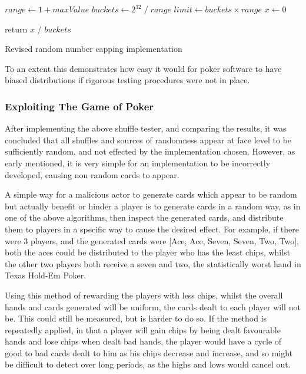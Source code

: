 \vspace{0.3cm}

\begin{algorithm}[H]
    \BlankLine{}
     $range \leftarrow 1 + maxValue$\;
     $buckets \leftarrow {2}^{32}\; / \;range$\;
     $limit \leftarrow buckets \times range$\;
     $x \leftarrow 0$\;

     

     return $x$ / $buckets$\;
\caption{Revised random number capping implementation}%
\label{code:rngGoodCapping}
\end{algorithm}

\vspace{0.3cm}

To an extent this demonstrates how easy it would for poker software to have
biased distributions if rigorous testing procedures were not in place.

\subsubsection{Exploiting The Game of Poker}

After implementing the above shuffle tester, and comparing the results,
it was concluded that all shuffles and sources of randomness appear at face
level to be sufficiently random, and not effected by the implementation chosen.
However, as early mentioned, it is very simple for an implementation to be
incorrectly developed, causing non random cards to appear.

A simple way for a malicious actor to generate cards which appear to be random
but actually benefit or hinder a player is to generate cards in a random
way, as in one of the above algorithms, then inspect the generated cards,
and distribute them to players in a specific way to cause the desired effect.
For example, if there were 3 players, and the generated cards were
[Ace, Ace, Seven, Seven, Two, Two], both the aces could be distributed to
the player who has the least chips, whilst the other two players both receive
a seven and two, the statistically worst hand in Texas Hold-Em Poker.

Using this method of rewarding the players with less chips, whilst the overall 
hands and cards generated will be uniform, the cards dealt to each player 
will not be. This could still be measured, but is harder to do so. If the
method is repeatedly applied, in that a player will gain chips by being dealt 
favourable hands and lose chips when dealt bad hands, the player would have 
a cycle of good to bad cards dealt to him as his chips decrease and increase, 
and so might be difficult to detect over long periods, as the highs and lows 
would cancel out.

